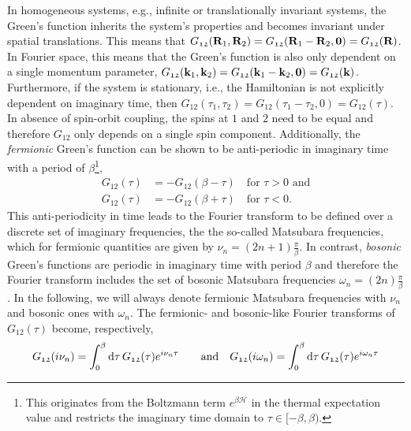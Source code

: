 \documentclass[../../main.tex]{subfiles}
\begin{document}
In homogeneous systems, e.g., infinite or translationally invariant systems, the Green's function inherits the system's properties and becomes invariant under spatial translations. This means that $G_{\mathfrak{12}}(\textbf{R}_1, \textbf{R}_2)=G_{\mathfrak{12}}(\textbf{R}_1-\textbf{R}_2,\textbf{0})=G_{\mathfrak{12}}(\textbf{R})$. In Fourier space, this means that the Green's function is also only dependent on a single momentum parameter, $G_{\mathfrak{12}}(\textbf{k}_1, \textbf{k}_2)=G_{\mathfrak{12}}(\textbf{k}_1-\textbf{k}_2,\textbf{0})=G_{\mathfrak{12}}(\textbf{k})$. Furthermore, if the system is stationary, i.e., the Hamiltonian is not explicitly dependent on imaginary time, then $G_{\mathfrak{12}}(\tau_1, \tau_2)=G_{\mathfrak{12}}(\tau_1-\tau_2,0)=G_{\mathfrak{12}}(\tau)$. In absence of spin-orbit coupling, the spins at $\mathfrak{1}$ and $\mathfrak{2}$ need to be equal and therefore $G_{\mathfrak{12}}$ only depends on a single spin component. Additionally, the \textit{fermionic} Green's function can be shown to be anti-periodic in imaginary time with a period of $\beta$\footnote{This originates from the Boltzmann term $e^{\beta\hat{\mathcal{H}}}$ in the thermal expectation value and restricts the imaginary time domain to $\tau\in[-\beta,\beta)$.},
\begin{subequations}
\begin{align}
	G_{\mathfrak{12}}(\tau)&=-G_{\mathfrak{12}}(\beta-\tau)\quad\text{for } \tau>0 \text{ and}\\
	G_{\mathfrak{12}}(\tau)&=-G_{\mathfrak{12}}(\beta+\tau)\quad\text{for } \tau<0.
\end{align}
\end{subequations}
This anti-periodicity in time leads to the Fourier transform to be defined over a discrete set of imaginary frequencies, the the so-called Matsubara frequencies, which for fermionic quantities are given by $\nu_n=(2n+1)\frac\pi\beta$. In contrast, \textit{bosonic} Green's functions are periodic in imaginary time with period $\beta$ and therefore the Fourier transform includes the set of bosonic Matsubara frequencies $\omega_n=(2n)\frac\pi\beta$. In the following, we will always denote fermionic Matsubara frequencies with $\nu_n$ and bosonic ones with $\omega_n$. The fermionic- and bosonic-like Fourier transforms of $G_{\mathfrak{12}}(\tau)$ become, respectively,
\begin{align}
	G_{\mathfrak{12}}(i\nu_n)=\int_{0}^{\beta}\text{d}\tau\,G_{\mathfrak{12}}(\tau) e^{i\nu_n\tau} \qquad\text{and}\quad G_{\mathfrak{12}}(i\omega_n)=\int_{0}^{\beta}\text{d}\tau\,G_{\mathfrak{12}}(\tau) e^{i\omega_n\tau}
\end{align}
\end{document}
